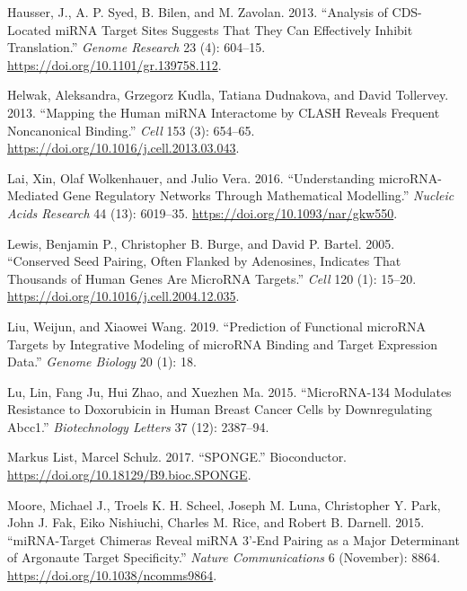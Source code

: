 \documentclass[]{article}
\begin{document}
\leavevmode\hypertarget{ref-hausser_analysis_2013}{}%
Hausser, J., A. P. Syed, B. Bilen, and M. Zavolan. 2013. ``Analysis of
CDS-Located miRNA Target Sites Suggests That They Can Effectively
Inhibit Translation.'' \emph{Genome Research} 23 (4): 604--15.
\url{https://doi.org/10.1101/gr.139758.112}.

\leavevmode\hypertarget{ref-helwak_mapping_2013}{}%
Helwak, Aleksandra, Grzegorz Kudla, Tatiana Dudnakova, and David
Tollervey. 2013. ``Mapping the Human miRNA Interactome by CLASH Reveals
Frequent Noncanonical Binding.'' \emph{Cell} 153 (3): 654--65.
\url{https://doi.org/10.1016/j.cell.2013.03.043}.

\leavevmode\hypertarget{ref-lai_understanding_2016}{}%
Lai, Xin, Olaf Wolkenhauer, and Julio Vera. 2016. ``Understanding
microRNA-Mediated Gene Regulatory Networks Through Mathematical
Modelling.'' \emph{Nucleic Acids Research} 44 (13): 6019--35.
\url{https://doi.org/10.1093/nar/gkw550}.

\leavevmode\hypertarget{ref-lewis_conserved_2005}{}%
Lewis, Benjamin P., Christopher B. Burge, and David P. Bartel. 2005.
``Conserved Seed Pairing, Often Flanked by Adenosines, Indicates That
Thousands of Human Genes Are MicroRNA Targets.'' \emph{Cell} 120 (1):
15--20. \url{https://doi.org/10.1016/j.cell.2004.12.035}.

\leavevmode\hypertarget{ref-liu2019prediction}{}%
Liu, Weijun, and Xiaowei Wang. 2019. ``Prediction of Functional microRNA
Targets by Integrative Modeling of microRNA Binding and Target
Expression Data.'' \emph{Genome Biology} 20 (1): 18.

\leavevmode\hypertarget{ref-lu2015microrna}{}%
Lu, Lin, Fang Ju, Hui Zhao, and Xuezhen Ma. 2015. ``MicroRNA-134
Modulates Resistance to Doxorubicin in Human Breast Cancer Cells by
Downregulating Abcc1.'' \emph{Biotechnology Letters} 37 (12): 2387--94.

\leavevmode\hypertarget{ref-markus_list_sponge_2017}{}%
Markus List, Marcel Schulz. 2017. ``SPONGE.'' Bioconductor.
\url{https://doi.org/10.18129/B9.bioc.SPONGE}.

\leavevmode\hypertarget{ref-moore_mirnatarget_2015}{}%
Moore, Michael J., Troels K. H. Scheel, Joseph M. Luna, Christopher Y.
Park, John J. Fak, Eiko Nishiuchi, Charles M. Rice, and Robert B.
Darnell. 2015. ``miRNA-Target Chimeras Reveal miRNA 3'-End Pairing as a
Major Determinant of Argonaute Target Specificity.'' \emph{Nature
Communications} 6 (November): 8864.
\url{https://doi.org/10.1038/ncomms9864}.
\end{document}
